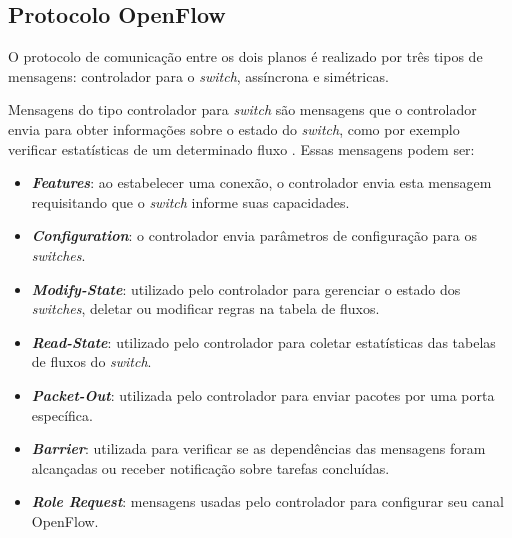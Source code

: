 
\subsection{Protocolo OpenFlow}
\label{subsec:protocolo-comunicacao}

O protocolo de comunicação entre os dois planos é realizado por três tipos de mensagens: controlador para o \textit{switch}, assíncrona e simétricas. 

Mensagens do tipo controlador para \textit{switch} são mensagens que o controlador envia para obter informações sobre o estado do \textit{switch}, como por exemplo verificar estatísticas de um determinado fluxo \cite{OpenFlowSpec:2014}. Essas mensagens podem ser:
\begin{itemize}
    \item \textit{\textbf{Features}}: ao estabelecer uma conexão, o controlador envia esta mensagem requisitando que o \textit{switch} informe suas capacidades.
    \item \textit{\textbf{Configuration}}: o controlador envia parâmetros de configuração para os \textit{switches}. 
    \item \textit{\textbf{Modify-State}}: utilizado pelo controlador para gerenciar o estado dos \textit{switches}, deletar ou modificar regras na tabela de fluxos.
    \item \textit{\textbf{Read-State}}: utilizado pelo controlador para coletar estatísticas das tabelas de fluxos do \textit{switch}.
    \item \textit{\textbf{Packet-Out}}: utilizada pelo controlador para enviar pacotes por uma porta específica.
    \item \textit{\textbf{Barrier}}: utilizada para verificar se as dependências das mensagens foram alcançadas ou receber notificação sobre tarefas concluídas.
     \item \textit{\textbf{Role Request}}: mensagens usadas pelo controlador para configurar seu canal OpenFlow.
\end{itemize}

